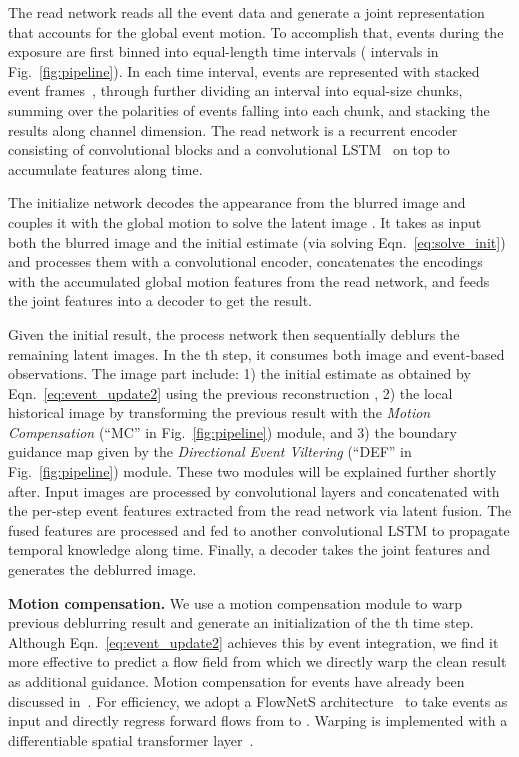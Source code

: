 \documentclass[10pt,twocolumn,letterpaper]{article}
\begin{document}
The read network reads all the event data and generate a joint representation that accounts for the global event motion. To accomplish that, events during the exposure are first binned into equal-length time intervals ( intervals in Fig.~\ref{fig:pipeline}). In each time interval, events are represented with stacked event frames~\cite{MostafaviCVPR19}, through further dividing an interval into  equal-size chunks, summing over the polarities of events falling into each chunk, and stacking the results along channel dimension. The read network is a recurrent encoder consisting of convolutional blocks and a convolutional LSTM~\cite{ShiNIPS15} on top to accumulate features along time.

The initialize network decodes the appearance from the blurred image and couples it with the global motion to solve the latent image . It takes as input both the blurred image  and the initial estimate  (via solving Eqn.~\eqref{eq:solve_init}) and processes them with a convolutional encoder, concatenates the encodings with the accumulated global motion features from the read network, and feeds the joint features into a decoder to get the result.

Given the initial result, the process network then sequentially deblurs the remaining latent images. In the th step, it consumes both image and event-based observations. The image part include: 1) the initial estimate  as obtained by Eqn.~\eqref{eq:event_update2} using the previous reconstruction , 2) the local historical image by transforming the previous result  with the \textit{Motion Compensation} (``MC'' in Fig.~\ref{fig:pipeline}) module, and 3) the boundary guidance map given by the \textit{Directional Event Viltering} (``DEF'' in Fig.~\ref{fig:pipeline}) module. These two modules will be explained further shortly after. Input images are processed by convolutional layers and concatenated with the per-step event features extracted from the read network via latent fusion. The fused features are processed and fed to another convolutional LSTM to propagate temporal knowledge along time. Finally, a decoder takes the joint features and generates the deblurred image.

\textbf{Motion compensation.} We use a motion compensation module to warp previous deblurring result  and generate an initialization of the th time step. Although Eqn.~\eqref{eq:event_update2} achieves this by event integration, we find it more effective to predict a flow field from which we directly warp the clean result  as additional guidance. Motion compensation for events have already been discussed in~\cite{GallegoCVPR18}. For efficiency, we adopt a FlowNetS architecture~\cite{DosovitskiyICCV15} to take events  as input and directly regress forward flows from  to . Warping is implemented with a differentiable spatial transformer layer~\cite{LaiECCV18,JiangCVPR18}.
\end{document}
